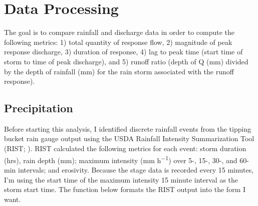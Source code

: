 \documentclass[
]{book}
\begin{document}
\hypertarget{data-processing}{%
\chapter{Data Processing}\label{data-processing}}

The goal is to compare rainfall and discharge data in order to compute the following metrics: 1) total quantity of response flow, 2) magnitude of peak response discharge, 3) duration of response, 4) lag to peak time (start time of storm to time of peak discharge), and 5) runoff ratio (depth of Q (mm) divided by the depth of rainfall (mm) for the rain storm associated with the runoff response).

\hypertarget{precipitation}{%
\section{Precipitation}\label{precipitation}}

Before starting this analysis, I identified discrete rainfall events from the tipping bucket rain gauge output using the USDA Rainfall Intensity Summarization Tool (RIST; \citep{ARS2013}). RIST calculated the following metrics for each event: storm duration (hrs), rain depth (mm); maximum intensity (mm h\textsuperscript{−1}) over 5-, 15-, 30-, and 60-min intervals; and erosivity. Because the stage data is recorded every 15 minutes, I'm using the start time of the maximum intensity 15 minute interval as the storm start time. The function below formats the RIST output into the form I want.
\end{document}
